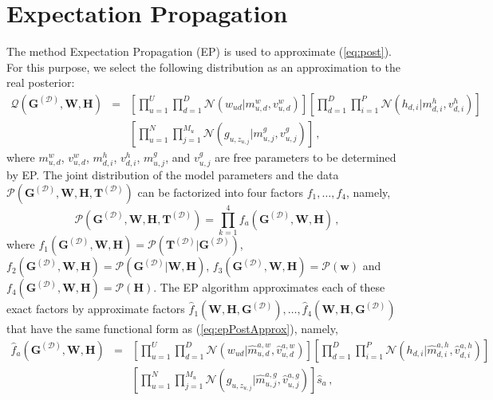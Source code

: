 \section{Expectation Propagation \label{sec:EPinference}}

The method Expectation Propagation (EP) is used to approximate (\ref{eq:post}).
For this purpose, we select the following distribution as an approximation to the real posterior:
\begin{eqnarray}
\mathcal{Q}(\mathbf{G}^{(\mathcal{D})},\mathbf{W},\mathbf{H}) & = & \left[\prod_{u=1}^{U}\prod_{d=1}^{D}\mathcal{N}(w_{ud}|m_{u,d}^{w},v_{u,d}^{w})\right]
\left[\prod_{d=1}^{D}\prod_{i=1}^{P} \mathcal{N}(h_{d,i}|m_{d,i}^h,v_{d,i}^{h})\right]\nonumber\\
& & \left[\prod_{u=1}^N \prod_{j=1}^{M_u} \mathcal{N}(g_{u,z_{u,j}}|m_{u,j}^g,v_{u,j}^g)\right]\,,\label{eq:epPostApprox}
\end{eqnarray}
where $m_{u,d}^w$, $v_{u,d}^w$, $m_{d,i}^h$, $v_{d,i}^h$,
$m_{u,j}^g$, and $v_{u,j}^g$ are free parameters to be determined by EP. 
The joint distribution of the model parameters and the data 
$\mathcal{P}(\mathbf{G}^{(\mathcal{D})},\mathbf{W},\mathbf{H},\mathbf{T}^{(\mathcal{D})})$ can be factorized
into four factors $f_1,\ldots,f_4$, namely,
\begin{equation}
\mathcal{P}(\mathbf{G}^{(\mathcal{D})},\mathbf{W},\mathbf{H},\mathbf{T}^{(\mathcal{D})}) = \prod_{k=1}^4 f_a(\mathbf{G}^{(\mathcal{D})},\mathbf{W},\mathbf{H})\,,
\end{equation}
where $f_1(\mathbf{G}^{(\mathcal{D})},\mathbf{W},\mathbf{H}) = \mathcal{P}(\mathbf{T}^{(\mathcal{D})}|\mathbf{G}^{(\mathcal{D})})$,
$f_2(\mathbf{G}^{(\mathcal{D})},\mathbf{W},\mathbf{H}) = \mathcal{P}(\mathbf{G}^{(\mathcal{D})}|\mathbf{W},\mathbf{H})$,
$f_3(\mathbf{G}^{(\mathcal{D})},\mathbf{W},\mathbf{H}) = \mathcal{P}(\mathbf{w})$ and
$f_4(\mathbf{G}^{(\mathcal{D})},\mathbf{W},\mathbf{H}) = \mathcal{P}(\mathbf{H})$.
The EP algorithm approximates each of these exact factors by 
approximate factors $\hat{f}_{1}(\mathbf{W},\mathbf{H},\mathbf{G}^{(\mathcal{D})}),\ldots,\hat{f}_{4}(\mathbf{W},\mathbf{H},\mathbf{G}^{(\mathcal{D})})$
that have the same functional form as (\ref{eq:epPostApprox}), namely,
\begin{eqnarray}
\hat{f}_a(\mathbf{G}^{(\mathcal{D})},\mathbf{W},\mathbf{H}) & = &
\left[\prod_{u=1}^{U}\prod_{d=1}^{D}\mathcal{N}(w_{ud}|\hat{m}_{u,d}^{a,w},\hat{v}_{u,d}^{a,w})\right]
\left[\prod_{d=1}^{D}\prod_{i=1}^{P} \mathcal{N}(h_{d,i}|\hat{m}_{d,i}^{a,h},\hat{v}_{d,i}^{a,h})\right]\nonumber\\
& & \left[\prod_{u=1}^N \prod_{j=1}^{M_u} \mathcal{N}(g_{u,z_{u,j}}|\hat{m}_{u,j}^{a,g},\hat{v}_{u,j}^{a,g})\right] \hat{s}_a\,,
\end{eqnarray}

